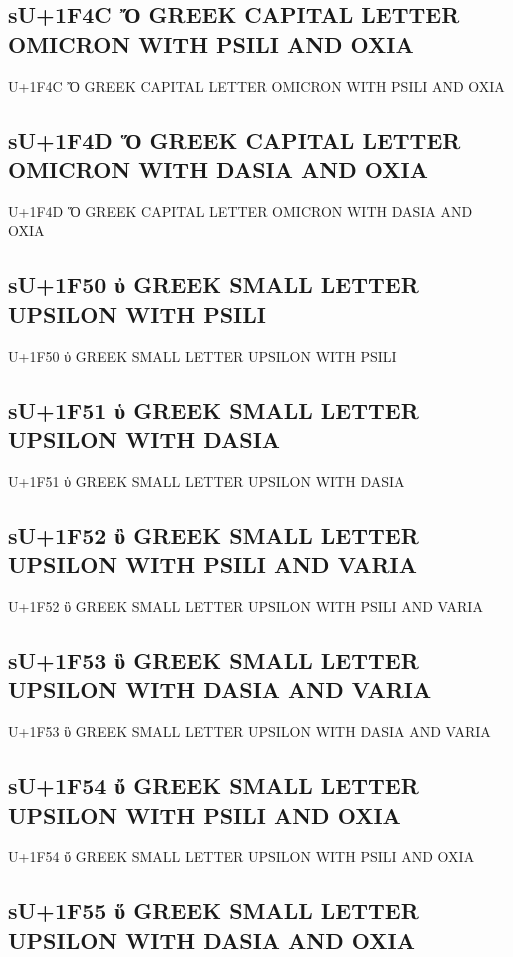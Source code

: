 \subsection{sU+1F4C Ὄ GREEK CAPITAL LETTER OMICRON WITH PSILI AND OXIA}

U+1F4C Ὄ GREEK CAPITAL LETTER OMICRON WITH PSILI AND OXIA

\subsection{sU+1F4D Ὅ GREEK CAPITAL LETTER OMICRON WITH DASIA AND OXIA}

U+1F4D Ὅ GREEK CAPITAL LETTER OMICRON WITH DASIA AND OXIA

\subsection{sU+1F50 ὐ GREEK SMALL LETTER UPSILON WITH PSILI}

U+1F50 ὐ GREEK SMALL LETTER UPSILON WITH PSILI

\subsection{sU+1F51 ὑ GREEK SMALL LETTER UPSILON WITH DASIA}

U+1F51 ὑ GREEK SMALL LETTER UPSILON WITH DASIA

\subsection{sU+1F52 ὒ GREEK SMALL LETTER UPSILON WITH PSILI AND VARIA}

U+1F52 ὒ GREEK SMALL LETTER UPSILON WITH PSILI AND VARIA

\subsection{sU+1F53 ὓ GREEK SMALL LETTER UPSILON WITH DASIA AND VARIA}

U+1F53 ὓ GREEK SMALL LETTER UPSILON WITH DASIA AND VARIA

\subsection{sU+1F54 ὔ GREEK SMALL LETTER UPSILON WITH PSILI AND OXIA}

U+1F54 ὔ GREEK SMALL LETTER UPSILON WITH PSILI AND OXIA

\subsection{sU+1F55 ὕ GREEK SMALL LETTER UPSILON WITH DASIA AND OXIA}

